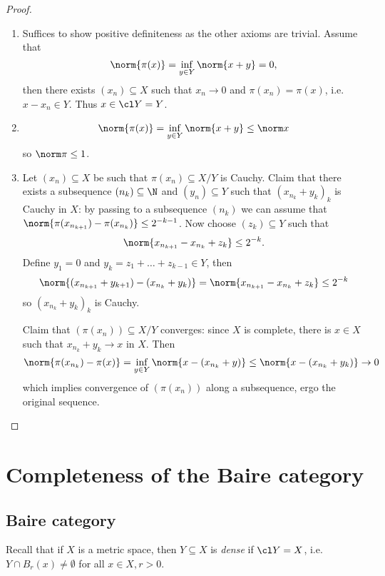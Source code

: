 \documentclass[a4paper]{article}
\begin{document}
\begin{proof}\leavevmode
  \begin{enumerate}
  \item Suffices to show positive definiteness as the other axioms are trivial. Assume that
    \[
      \norm{\pi(x)} = \inf_{y \in Y} \norm{x + y} = 0,
    \]
    then there exists \((x_n) \subseteq X\) such that \(x_n \to 0\) and \(\pi(x_n) = \pi(x)\), i.e.\ \(x - x_n \in Y\). Thus \(x \in \cl Y = Y\).
  \item
    \[
      \norm{\pi(x)} = \inf_{y \in Y} \norm{x + y} \leq \norm x
    \]
    so \(\norm \pi \leq 1\).
  \item Let \((x_n) \subseteq X\) be such that \(\pi(x_n) \subseteq X / Y\) is Cauchy. Claim that there exists a subsequence \((n_k) \subseteq \N\) and \((y_n) \subseteq Y\) such that \((x_{n_k} + y_k)_k\) is Cauchy in \(X\): by passing to a subsequence \((n_k)\) we can assume that \(\norm{\pi(x_{n_{k + 1}}) - \pi(x_{n_k})} \leq 2^{-k - 1}\). Now choose \((z_k) \subseteq Y\) such that
    \[
      \norm{x_{n_{k + 1}} - x_{n_k} + z_k} \leq 2^{-k}.
    \]
    Define \(y_1 = 0\) and \(y_k = z_1 + \dots + z_{k - 1} \in Y\), then
    \[
      \norm{(x_{n_{k + 1}} + y_{k + 1}) - (x_{n_k} + y_k)}
      = \norm{x_{n_{k + 1}} - x_{n_k} + z_k}
        \leq 2^{-k}
    \]
    so \((x_{n_k} + y_k)_k\) is Cauchy.

    Claim that \((\pi(x_n)) \subseteq X / Y\) converges: since \(X\) is complete, there is \(x \in X\) such that \(x_{n_k} + y_k \to x\) in \(X\). Then
    \[
      \norm{\pi(x_{n_k}) - \pi(x)}
      = \inf_{y \in Y} \norm{x - (x_{n_k} + y)}
      \leq \norm{x - (x_{n_k} + y_k)}
      \to 0
    \]
    which implies convergence of \((\pi(x_n))\) along a subsequence, ergo the original sequence.
  \end{enumerate}
\end{proof}

\section{Completeness of the Baire category}

\subsection{Baire category}

Recall that if \(X\) is a metric space, then \(Y \subseteq X\) is \emph{dense} if \(\cl Y = X\), i.e.\ \(Y \cap B_r(x) \neq \emptyset\) for all \(x \in X, r > 0\).
\end{document}
